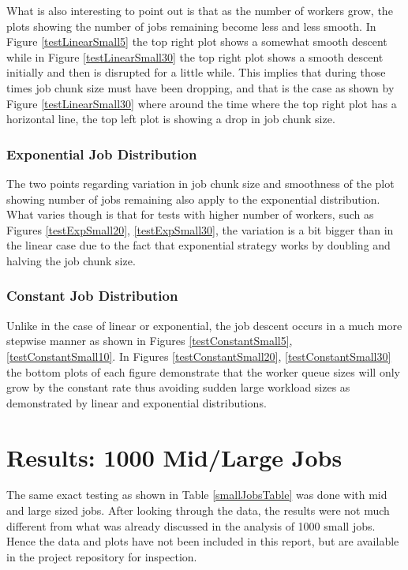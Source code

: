 \documentclass{article}
\begin{document}
What is also interesting to point out is that as the number of workers grow, the plots showing the number of jobs remaining become less and less smooth. In Figure \ref{testLinearSmall5} the top right plot shows a somewhat smooth descent while in Figure \ref{testLinearSmall30} the top right plot shows a smooth descent initially and then is disrupted for a little while. This implies that during those times job chunk size must have been dropping, and that is the case as shown by Figure \ref{testLinearSmall30} where around the time where the top right plot has a horizontal line, the top left plot is showing a drop in job chunk size.

\subsubsection{Exponential Job Distribution} \label{smallJobDistributionExp} 

The two points regarding variation in job chunk size and smoothness of the plot showing number of jobs remaining also apply to the exponential distribution. What varies though is that for tests with higher number of workers, such as Figures \ref{testExpSmall20}, \ref{testExpSmall30}, the variation is a bit bigger than in the linear case due to the fact that exponential strategy works by doubling and halving the job chunk size.

\subsubsection{Constant Job Distribution} \label{smallJobDistributionConstant}

Unlike in the case of linear or exponential, the job descent occurs in a much more stepwise manner as shown in Figures \ref{testConstantSmall5}, \ref{testConstantSmall10}. In Figures \ref{testConstantSmall20}, \ref{testConstantSmall30} the bottom plots of each figure demonstrate that the worker queue sizes will only grow by the constant rate thus avoiding sudden large workload sizes as demonstrated by linear and exponential distributions.

\section{Results: 1000 Mid/Large Jobs} \label{1000MidLargeJobs}
The same exact testing as shown in Table \ref{smallJobsTable} was done with mid and large sized jobs. After looking through the data, the results were not much different from what was already discussed in the analysis of 1000 small jobs. Hence the data and plots have not been included in this report, but are available in the project repository for inspection.
\end{document}
